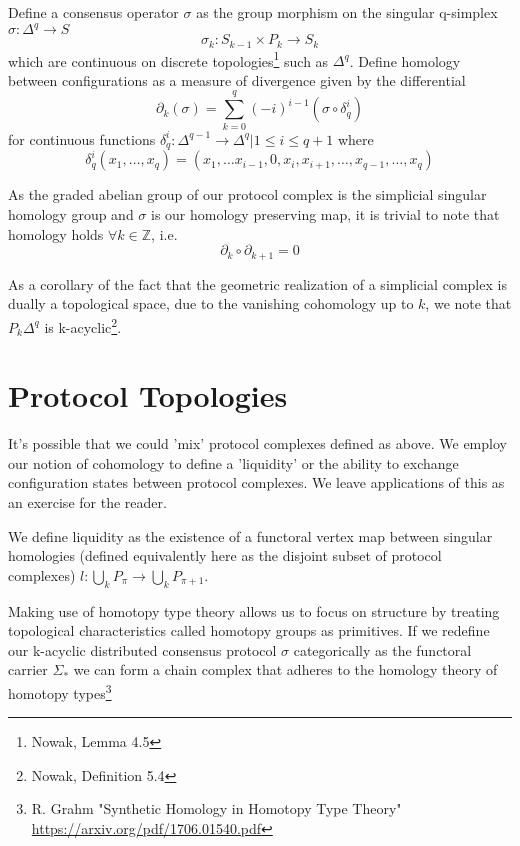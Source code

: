 \documentclass{article}
\begin{document}
Define a consensus operator $\sigma$ as the group morphism on the singular q-simplex $\sigma: \Delta^q \rightarrow S$ 
\begin{equation} \label{eq1}
\sigma_k: S_{k-1} \times P_k \rightarrow S_{k}
\end{equation} \label{eq1}
which are continuous on discrete topologies\footnote{Nowak, Lemma 4.5} such as $\Delta^q$. Define homology between configurations as a measure of divergence given by the differential 
\begin{equation} \label{eq1}
\partial_k(\sigma) = \sum^{q}_{k=0} (-i)^{i-1}(\sigma \circ \delta_q^{i} )
\end{equation} \label{eq1}
for continuous functions $\delta^{i}_q: \Delta^{q-1} \rightarrow \Delta^q | 1 \leq i \leq q+1$ where 
\begin{equation} \label{eq1}
\delta^{i}_q(x_1, \dots, x_q) = (x_1, \dots x_{i-1}, 0, x_i, x_{i+1}, \dots, x_{q-1}, \dots, x_q)
\end{equation} \label{eq1}

As the graded abelian group of our protocol complex is the simplicial singular homology group and $\sigma$ is our homology preserving map, it is trivial to note that homology holds $\forall k \in \mathbb{Z}$, i.e.
\begin{equation} \label{eq1}
\partial_k \circ \partial_{k+1} = 0
\end{equation} \label{eq1}

As a corollary of the fact that the geometric realization of a simplicial complex is dually a topological space, due to the vanishing cohomology up to $k$, we note that $P_k\Delta^q$ is k-acyclic\footnote{Nowak, Definition 5.4}.

\section{Protocol Topologies}
It's possible that we could 'mix' protocol complexes defined as above. We employ our notion of cohomology to define a 'liquidity' or the ability to exchange configuration states between protocol complexes. We leave applications of this as an exercise for the reader.

We define liquidity as the existence of a functoral vertex map between singular homologies (defined equivalently here as the disjoint subset of protocol complexes) $l: \bigcup_{k} P_{\pi} \rightarrow \bigcup_{k} P_{\pi+1}$.

Making use of homotopy type theory allows us to focus on structure by treating topological characteristics called homotopy groups as primitives. If we redefine our k-acyclic distributed consensus protocol $\sigma$ categorically as the functoral carrier $\Sigma_{*}$  we can form a chain complex that adheres to the homology theory of homotopy types\footnote{R. Grahm "Synthetic Homology in Homotopy Type Theory" \url{https://arxiv.org/pdf/1706.01540.pdf}}
\end{document}
